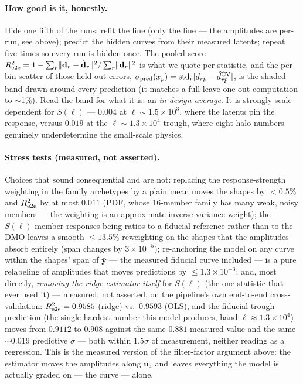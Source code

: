 \paragraph{How good is it, honestly.}
Hide one fifth of the runs; refit the line (only the line --- the
amplitudes are per-run, see above); predict the hidden curves from their
measured latents; repeat five times so every run is hidden once.  The
pooled score
$R^2_{\rm e2e}=1-\sum_r\lVert\mathbf{d}_r-\hat{\mathbf{d}}_r\rVert^2
/\sum_r\lVert\mathbf{d}_r\rVert^2$ is what we quote per statistic, and
the per-bin scatter of those held-out errors,
$\sigma_{\rm pred}(x_p)=\mathrm{std}_r[d_{rp}-\hat d^{\rm CV}_{rp}]$, is
the shaded band drawn around every prediction (it matches a full
leave-one-out computation to $\sim$1\%).  Read the band for what it is:
an \emph{in-design average}.  It is strongly scale-dependent for
$S(\ell)$ --- $0.004$ at $\ell\sim1.5\times10^{3}$, where the latents pin
the response, versus $0.019$ at the $\ell\sim1.3\times10^{4}$ trough,
where eight halo numbers genuinely underdetermine the small-scale
physics.

\paragraph{Stress tests (measured, not asserted).}
Choices that sound consequential and are not: replacing the
response-strength weighting in the family archetypes by a plain mean
moves the shapes by $<0.5\%$ and $R^2_{\rm e2e}$ by at most $0.011$
(PDF, whose 16-member family has many weak, noisy members --- the
weighting is an approximate inverse-variance weight); the $S(\ell)$
member responses being ratios to a fiducial reference rather than to the
DMO leaves a smooth $\le13.5\%$ reweighting on the shapes that the
amplitudes absorb entirely (span changes by $3\times10^{-5}$);
re-anchoring the model on any curve within the shapes' span of
$\bar{\mathbf{y}}$ --- the measured fiducial curve included --- is a pure
relabeling of amplitudes that moves predictions by
$\le1.3\times10^{-3}$; and, most directly, \emph{removing the ridge
estimator itself} for $S(\ell)$ (the one statistic that ever used it) ---
measured, not asserted, on the pipeline's own end-to-end cross-validation:
$R^2_{\rm e2e}=0.9585$ (ridge) vs.\ $0.9593$ (OLS), and the fiducial
trough prediction (the single hardest number this model produces, band
$\ell\approx1.3\times10^4$) moves from $0.9112$ to $0.908$ against the
same $0.881$ measured value and the same $\sim0.019$ predictive $\sigma$
--- both within $1.5\sigma$ of measurement, neither reading as a
regression. This is the measured version of the filter-factor argument
above: the estimator moves the amplitudes along $\mathbf{u}_4$ and leaves
everything the model is actually graded on --- the curve --- alone.
